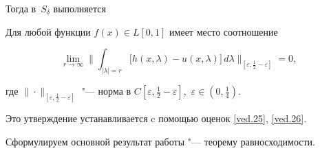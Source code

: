 Тогда в~$S_{\delta}$ выполняется 



\smallskip



\hypertarget{kor:lemma4}{}



\begin{lemma}[4]Для любой функции $f(x)\in L[0,1]$ имеет место соотношение

$$ 

\lim_{r\rightarrow\infty} \biggl\| 

\int_{|\lambda|=r} \bigl[h(x,\lambda)-u(x,\lambda)\bigr]\, d\lambda \biggr\|_{[\varepsilon,\frac{1}{2}-\varepsilon]} = 0,

$$

где $\|{}\cdot{} \|_{[\varepsilon,\frac{1}{2}-\varepsilon]}$ "--- норма в $C[\varepsilon,\frac{1}{2}-\varepsilon],$ $\varepsilon\in (0,\frac{1}{4})$.

\end{lemma}



\smallskip



Это утверждение устанавливается c помощью оценок \eqref{ved.25}, \eqref{ved.26}.    



\pagebreak




Сформулируем основной результат работы "--- теорему равносходимости.

\smallskip



